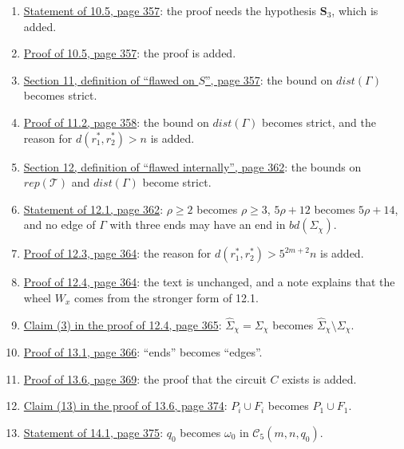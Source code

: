 \begin{enumerate}
``one end of $F_1$'' becomes ``one end of $F_0$''.
\item {}\hyperref[fix:10.5]{Statement of 10.5, page 357}: the proof needs the hypothesis $\mathbf{S}_3$, which is added.
\item {}\hyperref[fix:10.5-proof-added]{Proof of 10.5, page 357}: the proof is added.
\item {}\hyperref[fix:11-flawed-on-S]{Section 11, definition of ``flawed on $S$'', page 357}: the
bound on $dist(\Gamma)$ becomes strict.
\item {}\hyperref[fix:11.2-proof]{Proof of 11.2, page 358}: the bound on $dist(\Gamma)$ becomes
strict, and the reason for $d(r_1^*, r_2^*) > n$ is added.
\item {}\hyperref[fix:12-flawed-internally]{Section 12, definition of ``flawed internally'', page
362}: the bounds on $rep(\mathscr{T})$ and $dist(\Gamma)$ become strict.
\item {}\hyperref[fix:12.1]{Statement of 12.1, page 362}: $\rho \ge 2$ becomes $\rho \ge 3$,
$5\rho + 12$ becomes $5\rho + 14$, and no edge of $\Gamma$ with three ends may have an end in
$bd(\Sigma_\chi)$.
\item {}\hyperref[fix:12.3-proof]{Proof of 12.3, page 364}: the reason for
$d(r_1^*, r_2^*) > 5^{2m+2}n$ is added.
\item {}\hyperref[fix:12.4-proof]{Proof of 12.4, page 364}: the text is unchanged, and a note
explains that the wheel $W_x$ comes from the stronger form of 12.1.
\item {}\hyperref[fix:12.4-claim3]{Claim (3) in the proof of 12.4, page 365}:
$\hat{\Sigma}_\chi = \Sigma_\chi$ becomes $\hat{\Sigma}_\chi \setminus \Sigma_\chi$.
\item {}\hyperref[fix:13.1-proof]{Proof of 13.1, page 366}: ``ends'' becomes ``edges''.
\item {}\hyperref[fix:13.6-C-proof-added]{Proof of 13.6, page 369}: the proof that the circuit $C$
exists is added.
\item {}\hyperref[fix:13.6-claim13]{Claim (13) in the proof of 13.6, page 374}: $P_i \cup F_i$
becomes $P_1 \cup F_1$.
\item {}\hyperref[fix:14.1]{Statement of 14.1, page 375}: $q_0$ becomes $\omega_0$ in
$\mathscr{C}_5(m, n, q_0)$.

\end{enumerate}
